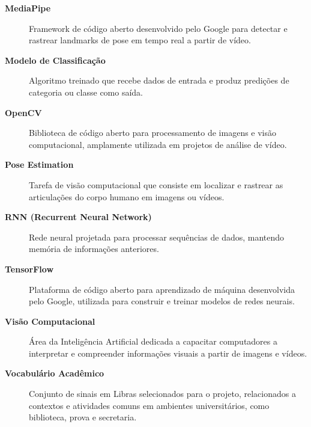 \begin{description}
    \item[\textbf{MediaPipe}] Framework de código aberto desenvolvido pelo Google para detectar e rastrear landmarks de pose em tempo real a partir de vídeo.

    \item[\textbf{Modelo de Classificação}] Algoritmo treinado que recebe dados de entrada e produz predições de categoria ou classe como saída.

    \item[\textbf{OpenCV}] Biblioteca de código aberto para processamento de imagens e visão computacional, amplamente utilizada em projetos de análise de vídeo.

    \item[\textbf{Pose Estimation}] Tarefa de visão computacional que consiste em localizar e rastrear as articulações do corpo humano em imagens ou vídeos.

    \item[\textbf{RNN (Recurrent Neural Network)}] Rede neural projetada para processar sequências de dados, mantendo memória de informações anteriores.

    \item[\textbf{TensorFlow}] Plataforma de código aberto para aprendizado de máquina desenvolvida pelo Google, utilizada para construir e treinar modelos de redes neurais.

    \item[\textbf{Visão Computacional}] Área da Inteligência Artificial dedicada a capacitar computadores a interpretar e compreender informações visuais a partir de imagens e vídeos.

    \item[\textbf{Vocabulário Acadêmico}] Conjunto de sinais em Libras selecionados para o projeto, relacionados a contextos e atividades comuns em ambientes universitários, como biblioteca, prova e secretaria.

\end{description}